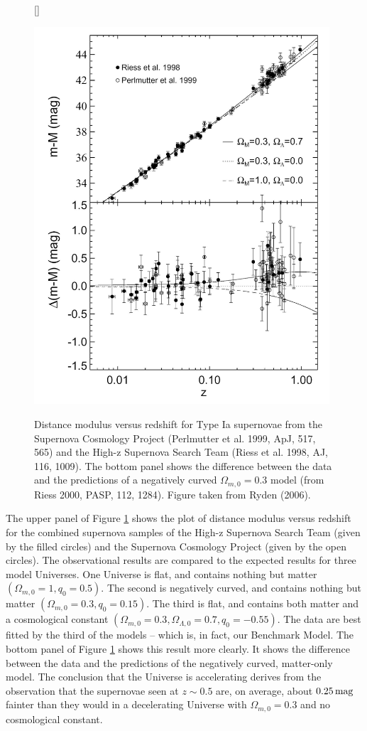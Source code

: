 \documentclass[a4paper,11pt]{article}
\begin{document}
\begin{figure}[h]
    [\FBwidth]
    {\caption{\footnotesize{Distance modulus versus redshift for Type Ia supernovae from the Supernova Cosmology Project (Perlmutter et al. 1999, ApJ, 517, 565) and the High-z Supernova Search Team (Riess et al. 1998, AJ, 116, 1009). The bottom panel shows the difference between the data and the predictions of a negatively curved $\Omega_{m,0}=0.3$ model (from Riess 2000, PASP, 112, 1284). Figure taken from Ryden (2006).}}
    \label{fig:distancemodulus}}
    {\includegraphics[width=11cm]{figures/DistanceModulus.png}}
\end{figure}

{\noindent}The upper panel of Figure \ref{fig:distancemodulus} shows the plot of distance modulus versus redshift for the combined supernova samples of the High-z Supernova Search Team (given by the filled circles) and the Supernova Cosmology Project (given by the open circles). The observational results are compared to the expected results for three model Universes. One Universe is flat, and contains nothing but matter $(\Omega_{m,0}=1, q_0=0.5)$. The second is negatively curved, and contains nothing but matter $(\Omega_{m,0}=0.3, q_0=0.15)$. The third is flat, and contains both matter and a cosmological constant $(\Omega_{m,0}=0.3, \Omega_{\Lambda,0}=0.7, q_0=−0.55).$ The data are best fitted by the third of the models -- which is, in fact, our Benchmark Model. The bottom panel of Figure \ref{fig:distancemodulus} shows this result more clearly. It shows the difference between the data and the predictions of the negatively curved, matter-only model. The conclusion that the Universe is accelerating derives from the observation that the supernovae seen at $z \sim 0.5$ are, on average, about $0.25\,{\rm mag}$ fainter than they would in a decelerating Universe with $\Omega_{m,0}=0.3$ and no cosmological constant.
 
\end{document}
